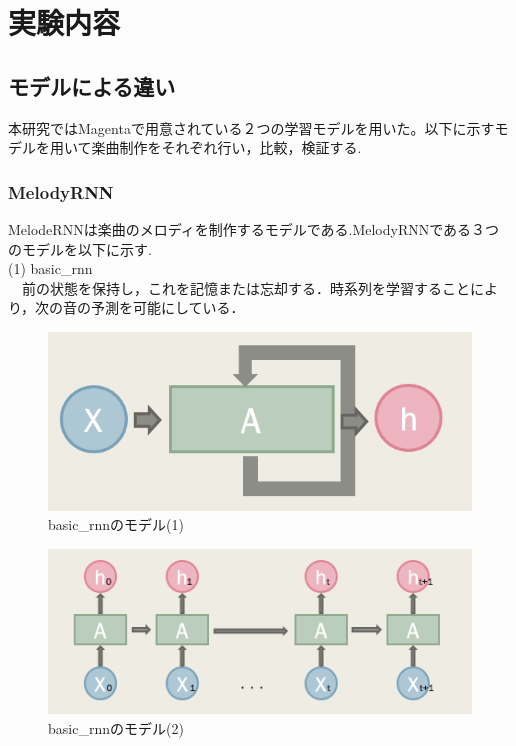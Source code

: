 \chapter{実験内容}
\section{モデルによる違い}
本研究ではMagentaで用意されている２つの学習モデルを用いた。以下に示すモデルを用いて楽曲制作をそれぞれ行い，比較，検証する.
\subsection{MelodyRNN}
MelodeRNNは楽曲のメロディを制作するモデルである.MelodyRNNである３つのモデルを以下に示す.\\
(1) basic\_rnn\\
　前の状態を保持し，これを記憶または忘却する．時系列を学習することにより，次の音の予測を可能にしている．
\begin{figure}[!ht]
    \begin{screen}
    \begin{center}
        \includegraphics[scale=1,clip]{./img/basic3.png}
        \caption{basic\_rnnのモデル(1)}
        \label{fig:basicrnnのモデル(1)}
    \end{center}
    \end{screen}
\end{figure}
\newpage
\begin{figure}[!ht]
    \begin{screen}
    \begin{center}
        \includegraphics[scale=0.8,clip]{./img/basic4.png}
        \caption{basic\_rnnのモデル(2)}
        \label{fig:basic_rnnのモデル(2)}
    \end{center}
    \end{screen}
\end{figure}
